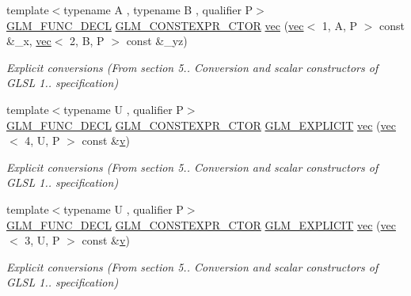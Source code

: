 \begin{DoxyCompactItemize}
{\footnotesize template$<$typename A , typename B , qualifier P$>$ }\\\hyperlink{setup_8hpp_ab2d052de21a70539923e9bcbf6e83a51}{G\+L\+M\+\_\+\+F\+U\+N\+C\+\_\+\+D\+E\+CL} \hyperlink{setup_8hpp_ad34178a09666081abdb573c14d1f4a5a}{G\+L\+M\+\_\+\+C\+O\+N\+S\+T\+E\+X\+P\+R\+\_\+\+C\+T\+OR} \hyperlink{structglm_1_1vec_3_013_00_01_t_00_01_q_01_4_a40cfee6d5aafeb1fe818ae483fad24a3}{vec} (\hyperlink{structglm_1_1vec}{vec}$<$ 1, A, P $>$ const \&\+\_\+x, \hyperlink{structglm_1_1vec}{vec}$<$ 2, B, P $>$ const \&\+\_\+yz)
\begin{DoxyCompactList}\small\item\em Explicit conversions (From section 5.. Conversion and scalar constructors of G\+L\+SL 1.. specification) \end{DoxyCompactList}\item 
{\footnotesize template$<$typename U , qualifier P$>$ }\\\hyperlink{setup_8hpp_ab2d052de21a70539923e9bcbf6e83a51}{G\+L\+M\+\_\+\+F\+U\+N\+C\+\_\+\+D\+E\+CL} \hyperlink{setup_8hpp_ad34178a09666081abdb573c14d1f4a5a}{G\+L\+M\+\_\+\+C\+O\+N\+S\+T\+E\+X\+P\+R\+\_\+\+C\+T\+OR} \hyperlink{setup_8hpp_a6c74f5a5e7b134ab69023ff9a30d4d5d}{G\+L\+M\+\_\+\+E\+X\+P\+L\+I\+C\+IT} \hyperlink{structglm_1_1vec_3_013_00_01_t_00_01_q_01_4_a6a3c6e504114be5310317d725eda50ea}{vec} (\hyperlink{structglm_1_1vec}{vec}$<$ 4, U, P $>$ const \&\hyperlink{_s_d_l__opengl_8h_a10a82eabcb59d2fcd74acee063775f90}{v})
\begin{DoxyCompactList}\small\item\em Explicit conversions (From section 5.. Conversion and scalar constructors of G\+L\+SL 1.. specification) \end{DoxyCompactList}\item 
{\footnotesize template$<$typename U , qualifier P$>$ }\\\hyperlink{setup_8hpp_ab2d052de21a70539923e9bcbf6e83a51}{G\+L\+M\+\_\+\+F\+U\+N\+C\+\_\+\+D\+E\+CL} \hyperlink{setup_8hpp_ad34178a09666081abdb573c14d1f4a5a}{G\+L\+M\+\_\+\+C\+O\+N\+S\+T\+E\+X\+P\+R\+\_\+\+C\+T\+OR} \hyperlink{setup_8hpp_a6c74f5a5e7b134ab69023ff9a30d4d5d}{G\+L\+M\+\_\+\+E\+X\+P\+L\+I\+C\+IT} \hyperlink{structglm_1_1vec_3_013_00_01_t_00_01_q_01_4_a47d23576cd135fb6f6b964ed9d4e3599}{vec} (\hyperlink{structglm_1_1vec}{vec}$<$ 3, U, P $>$ const \&\hyperlink{_s_d_l__opengl_8h_a10a82eabcb59d2fcd74acee063775f90}{v})
\begin{DoxyCompactList}\small\item\em Explicit conversions (From section 5.. Conversion and scalar constructors of G\+L\+SL 1.. specification) \end{DoxyCompactList}\item 

\end{DoxyCompactItemize}
